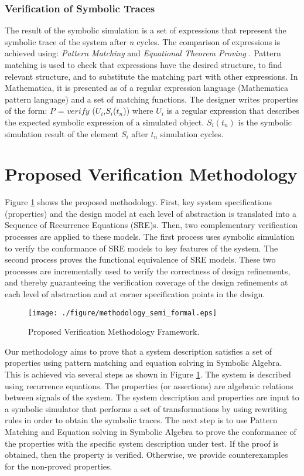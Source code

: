 \documentclass[submission,copyright,creativecommons]{eptcs}
\begin{document}
\subsubsection{Verification of Symbolic Traces}
The result of the symbolic simulation is a set of expressions that represent the symbolic trace of the system after \emph{n} cycles. The comparison of expressions is achieved using: \emph{Pattern Matching} \cite{76} and \emph{Equational Theorem Proving} \cite{77}. Pattern matching is used to check that expressions have the desired structure, to find relevant structure, and to substitute the matching part with other expressions. In Mathematica, it is presented as of a regular expression language (Mathematica pattern language) and a set of matching functions. The designer writes properties of the form: \(P\) = \(verify\) (\(U_{i}\),\(S_{i}\)(\(t_{n}\))) where \(U_{i}\) is a regular expression that describes the expected symbolic expression of a simulated object. \(S_{i}(t_{n})\) is the symbolic simulation result of the element \(S_{i}\) after \(t_{n}\) simulation cycles.

\section{Proposed Verification Methodology}
Figure \ref{Figure: Proposed Verification Methodology Framework000} shows the proposed methodology. First, key system specifications (properties) and the design model at each level of abstraction  is translated into a Sequence of Recurrence Equations (SRE)s. Then, two complementary verification processes are applied to these models. The first process uses symbolic simulation to verify the conformance of SRE models to key features of the system. The second process proves the functional equivalence of SRE models. These two processes are incrementally used to verify the correctness of design refinements, and thereby guaranteeing the verification coverage of the design refinements at each level of abstraction and at corner specification points in the design.
\begin{figure}[!htb]
\centering
\texttt{[image: ./figure/methodology\_semi\_formal.eps]}
\caption{\small{Proposed Verification Methodology Framework.}}
\label{Figure: Proposed Verification Methodology Framework000}
\end{figure}

Our methodology aims to prove that a system description satisfies a set of properties using pattern matching and equation solving in Symbolic Algebra. This is achieved via several steps as shown in Figure \ref{Figure: Proposed Verification Methodology Framework000}. The system is described using recurrence equations. The properties (or assertions) are algebraic relations between signals of the system. The system description and properties are input to a symbolic simulator that performs a set of transformations by using rewriting rules in order to obtain the symbolic traces. The next step is to use Pattern Matching and Equation solving in Symbolic Algebra to prove the conformance of the properties with the specific system description under test. If the proof is obtained, then the property is verified. Otherwise, we provide counterexamples for the non-proved properties.
\end{document}
